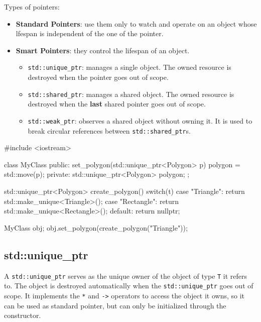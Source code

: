 Types of pointers:
\begin{itemize}
    \item \textbf{Standard Pointers}: use them only to watch and operate on an object whose lfespan is independent of the one of the pointer.
    \item \textbf{Smart Pointers}: they control the lifespan of an object. 
    \begin{itemize}
        \item \texttt{std::unique\_ptr}: manages a single object. The owned resource is destroyed when the pointer goes out of scope.
        \item \texttt{std::shared\_ptr}: manages a shared object. The owned resource is destroyed when the \textbf{last} shared pointer goes out of scope.
        \item \texttt{std::weak\_ptr}: observes a shared object without owning it. It is used to break circular references between \texttt{std::shared\_ptr}s.
    \end{itemize}
\end{itemize}

\begin{exampleblock}
    \begin{codeblock}[language=C++] 
#include <iostream>

class MyClass {
public:
        set_polygon(std::unique_ptr<Polygon> p) {
            polygon = std::move(p);
        }
private:
        std::unique_ptr<Polygon> polygon;
};

std::unique_ptr<Polygon> create_polygon() {
    switch(t){
        case "Triangle":
            return std::make_unique<Triangle>();
        case "Rectangle":
            return std::make_unique<Rectangle>();
        default:
            return nullptr;
    }
}

MyClass obj;
obj.set_polygon(create_polygon("Triangle"));

    \end{codeblock}
\end{exampleblock}

\subsection{std::unique\_ptr}
A \texttt{std::unique\_ptr} serves as the unique owner of the object of type \texttt{T} it refers to. The object is destroyed automatically when the \texttt{std::unique\_ptr} goes out of scope.
It implements the \texttt{*} and \texttt{->} operators to access the object it owns, so it can be used as standard pointer, but can only be initialized through the constructor. 

